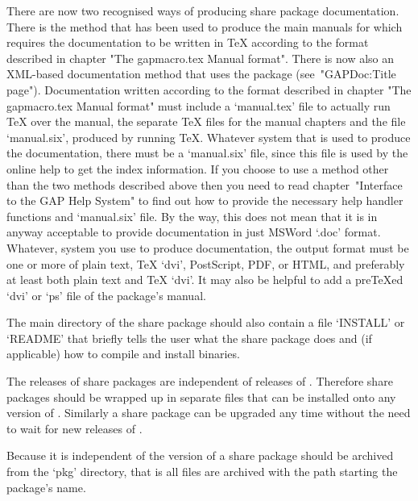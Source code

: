 There  are  now  two  recognised  ways   of   producing   share   package
documentation. There is the method that has been used to produce the main
manuals for {\GAP} which requires the  documentation  to  be  written  in
{\TeX} according to the format described  in  chapter  "The  gapmacro.tex
Manual format". There is now also an XML-based documentation method  that
uses   the       package    (see~"GAPDoc:Title    page").
Documentation written according to the format described in  chapter  "The
gapmacro.tex Manual format" must include a `manual.tex' file to  actually
run {\TeX} over the manual, the separate  {\TeX}  files  for  the  manual
chapters and the file `manual.six', produced by running {\TeX}.  Whatever
system that is used  to  produce  the  documentation,  there  must  be  a
`manual.six' file, since this file is used by the online help to get  the
index information. If you choose to use  a  method  other  than  the  two
methods described above then you need to read chapter~"Interface  to  the
GAP Help System" to find out how to provide the  necessary  help  handler
functions and `manual.six' file. By the way, this does not mean  that  it
is in anyway acceptable to provide documentation in just MSWord `.doc' format.
Whatever, system you use to produce documentation, the output format must
be one or more of plain text, {\TeX} `dvi', PostScript, PDF, or HTML, and
preferably at least both plain text and {\TeX}  `dvi'.  It  may  also  be
helpful to add a pre{\TeX}ed `dvi' or `ps' file of the package's manual.

The main directory of the share package should also contain a file `INSTALL'
or `README' that briefly tells the user what the share package does and (if
applicable) how to compile and install binaries.


The releases of share packages are independent of releases of {\GAP}.
Therefore share packages should be wrapped up in separate files that can be
installed onto any version of {\GAP}. Similarly a share package can be
upgraded any time without the need to wait for new releases of {\GAP}.

Because it is independent of the version of {\GAP} a share package should be
archived from the {\GAP} `pkg'  directory, that is all files are archived with
the path starting the package's name.

